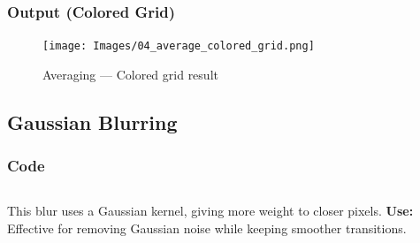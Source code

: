 \documentclass[a4paper,11pt]{article}
\begin{document}
		\subsubsection*{Output (Colored Grid)}
	\begin{figure}[H]
		\centering
		\texttt{[image: Images/04\_average\_colored\_grid.png]}
		\caption{Averaging — Colored grid result}
	\end{figure}
	\clearpage
	
	\subsection{Gaussian Blurring}
	\subsubsection*{Code}
	\inputminted{python}{Python_Files/05_gauss_blur.py}
	
	This blur uses a Gaussian kernel, giving more weight to closer pixels.  
	\textbf{Use:} Effective for removing Gaussian noise while keeping smoother transitions.
	

	
\end{document}
